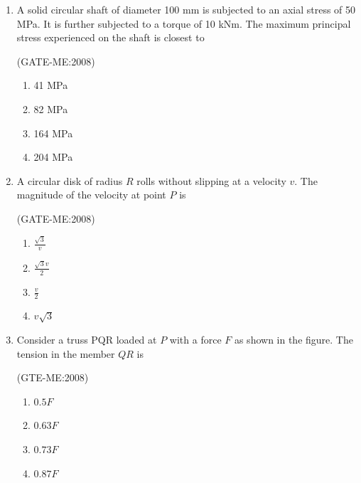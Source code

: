 \documentclass[journal,12pt,onecolumn]{IEEEtran}
\theoremstyle{remark}
\begin{document}
\begin{enumerate}
    \item A solid circular shaft of diameter 100 mm is subjected to an axial stress of 50 MPa. It is further subjected to a torque of 10 kNm. The maximum principal stress experienced on the shaft is closest to

	     \hfill{(GATE-ME:2008)}

    \begin{multicols}{4}
        \begin{enumerate}
            \item 41 MPa
            \item 82 MPa
            \item 164 MPa
            \item 204 MPa
        \end{enumerate}
    \end{multicols}

    \item A circular disk of radius $R$ rolls without slipping at a velocity $v$. The magnitude of the velocity at point $P$ is\\
	    \begin{center}
	    
	    \end{center}

	     \hfill{(GATE-ME:2008)}

       \begin{multicols}{4}
        \begin{enumerate}
            \item $\frac{\sqrt{3}}{v}$
            \item $\frac{\sqrt{3} v}{2}$
            \item $\frac{v}{2}$
            \item $v \sqrt{3}$
        \end{enumerate}
    \end{multicols}

    \item Consider a truss PQR loaded at $P$ with a force $F$ as shown in the figure. The tension in the member $QR$ is\\
	    \begin{center}
	    
	    \end{center}

	     \hfill{(GTE-ME:2008)}

       \begin{multicols}{4}
        \begin{enumerate}
            \item $0.5F$
            \item $0.63F$
            \item $0.73F$
            \item $0.87F$
        \end{enumerate}
    \end{multicols}


\end{enumerate}
\end{document}

